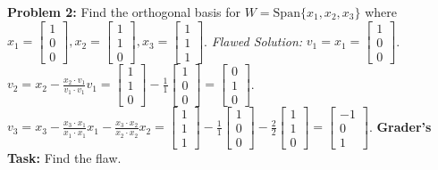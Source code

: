 \documentclass[11pt, letterpaper]{article}
\theoremstyle{definition}
\theoremstyle{remark}
\begin{document}
\textbf{Problem 2:} Find the orthogonal basis for $W = \text{Span}\{x_1, x_2, x_3\}$ where $x_1 = \begin{bmatrix} 1 \\ 0 \\ 0 \end{bmatrix}, x_2 = \begin{bmatrix} 1 \\ 1 \\ 0 \end{bmatrix}, x_3 = \begin{bmatrix} 1 \\ 1 \\ 1 \end{bmatrix}$.
\textit{Flawed Solution:}
$v_1 = x_1 = \begin{bmatrix} 1 \\ 0 \\ 0 \end{bmatrix}$.
$v_2 = x_2 - \frac{x_2 \cdot v_1}{v_1 \cdot v_1}v_1 = \begin{bmatrix} 1 \\ 1 \\ 0 \end{bmatrix} - \frac{1}{1}\begin{bmatrix} 1 \\ 0 \\ 0 \end{bmatrix} = \begin{bmatrix} 0 \\ 1 \\ 0 \end{bmatrix}$.
$v_3 = x_3 - \frac{x_3 \cdot x_1}{x_1 \cdot x_1}x_1 - \frac{x_3 \cdot x_2}{x_2 \cdot x_2}x_2 = \begin{bmatrix} 1 \\ 1 \\ 1 \end{bmatrix} - \frac{1}{1}\begin{bmatrix} 1 \\ 0 \\ 0 \end{bmatrix} - \frac{2}{2}\begin{bmatrix} 1 \\ 1 \\ 0 \end{bmatrix} = \begin{bmatrix} -1 \\ 0 \\ 1 \end{bmatrix}$.
\textbf{Grader's Task:} Find the flaw.
\end{document}
